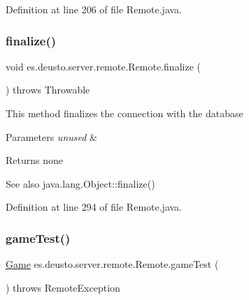 Definition at line 206 of file Remote.\+java.

\mbox{\label{classes_1_1deusto_1_1server_1_1remote_1_1_remote_ac8c5c24cdafa413da4ad7d71f7f710d3}} 
\subsubsection{\texorpdfstring{finalize()}{finalize()}}
{\footnotesize\ttfamily void es.\+deusto.\+server.\+remote.\+Remote.\+finalize (\begin{DoxyParamCaption}{ }\end{DoxyParamCaption}) throws Throwable\hspace{0.3cm}{\ttfamily [protected]}}

This method finalizes the connection with the database 
\begin{DoxyParams}{Parameters}
{\em unused} & \\
\hline
\end{DoxyParams}
\begin{DoxyReturn}{Returns}
none 
\end{DoxyReturn}
\begin{DoxySeeAlso}{See also}
java.\+lang.\+Object\+::finalize() 
\end{DoxySeeAlso}


Definition at line 294 of file Remote.\+java.

\mbox{\label{classes_1_1deusto_1_1server_1_1remote_1_1_remote_a6fb46c2635427f798b75c8ab124b54da}} 
\subsubsection{\texorpdfstring{game\+Test()}{gameTest()}}
{\footnotesize\ttfamily \hyperlink{classes_1_1deusto_1_1server_1_1db_1_1data_1_1_game}{Game} es.\+deusto.\+server.\+remote.\+Remote.\+game\+Test (\begin{DoxyParamCaption}{ }\end{DoxyParamCaption}) throws Remote\+Exception}

